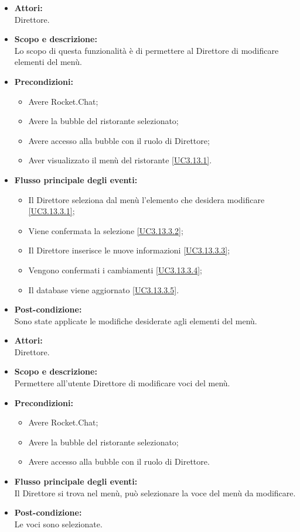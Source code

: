 \begin{itemize}
	\item \textbf{Attori:}
	\\Direttore.
	\item \textbf{Scopo e descrizione:} 
	\\Lo scopo di questa funzionalità è di permettere al Direttore di modificare elementi del menù.
	\item \textbf{Precondizioni:}
	\begin{itemize}
		\item Avere Rocket.Chat;
		\item Avere la bubble del ristorante selezionato;
		\item Avere accesso alla bubble con il ruolo di Direttore;
		\item Aver visualizzato il menù del ristorante \ref{UC3.13.1}.
	\end{itemize}
	\item \textbf{Flusso principale degli eventi:}
	\begin{itemize}
		\item Il Direttore seleziona dal menù l'elemento che desidera modificare \ref{UC3.13.3.1};
		\item Viene confermata la selezione \ref{UC3.13.3.2};
		\item Il Direttore inserisce le nuove informazioni \ref{UC3.13.3.3};
		\item Vengono confermati i cambiamenti \ref{UC3.13.3.4};
		\item Il database viene aggiornato \ref{UC3.13.3.5}.
	\end{itemize}
	\item \textbf{Post-condizione:}
	\\Sono state applicate le modifiche desiderate agli elementi del menù.
\end{itemize}


\begin{itemize}
	\item \textbf{Attori:}
	\\Direttore.
	\item \textbf{Scopo e descrizione:} 
	\\Permettere all'utente Direttore di modificare voci del menù.
	\item \textbf{Precondizioni:}
	\begin{itemize}
		\item Avere Rocket.Chat;
		\item Avere la bubble del ristorante selezionato;
		\item Avere accesso alla bubble con il ruolo di Direttore.
	\end{itemize}
	\item \textbf{Flusso principale degli eventi:}
	\\Il Direttore si trova nel menù, può selezionare la voce del menù da modificare.
	\item \textbf{Post-condizione:}
	\\Le voci sono selezionate.
\end{itemize}


